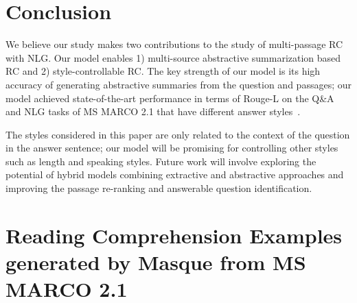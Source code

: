 \documentclass[11pt,a4paper]{article}
\theoremstyle{mydef}
\theoremstyle{myprob}
\begin{document}
\section{Conclusion}
We believe our study makes two contributions to the study of multi-passage RC with NLG. Our model enables 1) multi-source abstractive summarization based RC and 2) style-controllable RC. The key strength of our model is its high accuracy of generating abstractive summaries from the question and passages; our model achieved state-of-the-art performance in terms of Rouge-L on the Q\&A and NLG tasks of MS MARCO 2.1 that have different answer styles~\citep{Bajaj18}.

The styles considered in this paper are only related to the context of the question in the answer sentence; our model will be promising for controlling other styles such as length and speaking styles.
Future work will involve exploring the potential of hybrid models combining extractive and abstractive approaches and improving the passage re-ranking and answerable question identification.





\newpage
\appendix
\onecolumn
\section{Reading Comprehension Examples generated by Masque from MS MARCO 2.1}
\label{sec:examples}
\end{document}
